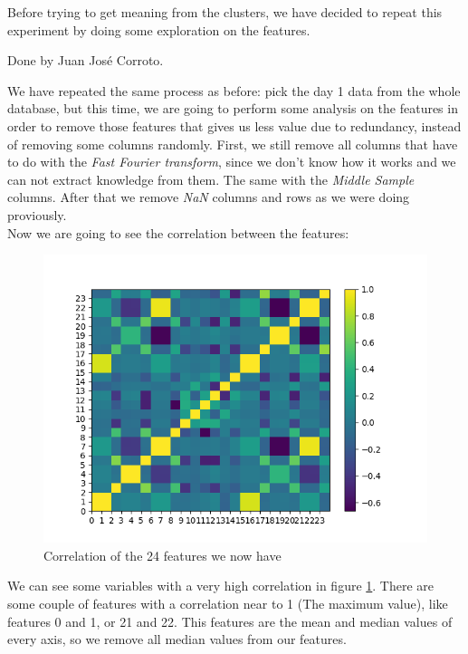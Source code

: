 \documentclass[idxtotoc,hyperref,openany]{labbook} %
\begin{document}
Before trying to get meaning from the clusters, we have decided to repeat this experiment by doing some exploration on the features.




Done by Juan Jos\'e Corroto.

We have repeated the same process as before: pick the day 1 data from the whole database, but this time, we are going to perform some analysis on the features in order to remove those features that gives us less value due to redundancy, instead of removing some columns randomly.
First, we still remove all columns that have to do with the \textit{Fast Fourier transform}, since we don't know how it works and we can not extract knowledge from them. The same with the \textit{Middle Sample} columns.
After that we remove \textit{NaN} columns and rows as we were doing proviously.\\

Now we are going to see the correlation between the features:

\begin{figure}[h]
\includegraphics[width=0.9\linewidth]{Features_CorrelationMatrix_preDrop_Day1.png}
\setlength\belowcaptionskip{-10pt}
\caption{Correlation of the 24 features we now have}
\label{Correlation predrop}
\end{figure}

We can see some variables with a very high correlation in figure \ref{Correlation predrop}. There are some couple of features with a correlation near to 1 (The maximum value), like features 0 and 1, or 21 and 22. This features are the mean and median values of every axis, so we remove all median values from our features. \\
\end{document}
